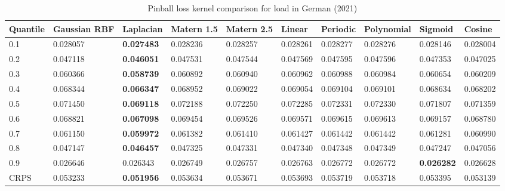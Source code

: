 \begin{table}[!ht]
    \centering
\caption{Pinball loss kernel comparison for load in German (2021)}
\label{tab:secures_met_de}
\begin{adjustbox}{width=\textwidth}
    \begin{tabular}{llllllllll}
\toprule
Quantile & Gaussian RBF & Laplacian & Matern 1.5 & Matern 2.5 & Linear & Periodic & Polynomial & Sigmoid & Cosine \\
\midrule
0.1 & 0.028057 & \textbf{0.027483} & 0.028236 & 0.028257 & 0.028261 & 0.028277 & 0.028276 & 0.028146 & 0.028004 \\
0.2 & 0.047118 & \textbf{0.046051} & 0.047531 & 0.047544 & 0.047569 & 0.047595 & 0.047596 & 0.047353 & 0.047025 \\
0.3 & 0.060366 & \textbf{0.058739} & 0.060892 & 0.060940 & 0.060962 & 0.060988 & 0.060984 & 0.060654 & 0.060209 \\
0.4 & 0.068344 & \textbf{0.066347} & 0.068952 & 0.069022 & 0.069054 & 0.069104 & 0.069101 & 0.068634 & 0.068202 \\
0.5 & 0.071450 & \textbf{0.069118} & 0.072188 & 0.072250 & 0.072285 & 0.072331 & 0.072330 & 0.071807 & 0.071359 \\
0.6 & 0.068821 & \textbf{0.067098} & 0.069454 & 0.069526 & 0.069571 & 0.069615 & 0.069613 & 0.069157 & 0.068780 \\
0.7 & 0.061150 & \textbf{0.059972} & 0.061382 & 0.061410 & 0.061427 & 0.061442 & 0.061442 & 0.061281 & 0.060990 \\
0.8 & 0.047147 & \textbf{0.046457} & 0.047325 & 0.047331 & 0.047340 & 0.047348 & 0.047349 & 0.047247 & 0.047056 \\
0.9 & 0.026646 & 0.026343 & 0.026749 & 0.026757 & 0.026763 & 0.026772 & 0.026772 & \textbf{0.026282} & 0.026628 \\ 
\midrule
CRPS & 0.053233 & \textbf{0.051956} & 0.053634 & 0.053671 & 0.053693 & 0.053719 & 0.053718 & 0.053395 & 0.053139 \\
\bottomrule
\end{tabular}
\end{adjustbox}
\end{table}





